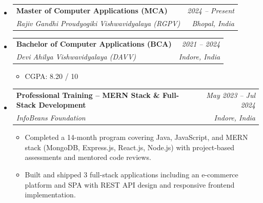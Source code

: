 \documentclass[a4paper,10pt]{article}
\makeatletter
\newcommand{\resumeSubheading}[4]{
  \vspace{2pt}\item
  \begin{tabular*}{\textwidth}{l@{\extracolsep{\fill}}r}
    \textbf{#1} & \textit{\small #2} \\
    \small\textit{#3} & \textit{\small #4} \\
  \end{tabular*}\vspace{-4pt}
}
\newcommand{\resumeItem}[1]{\item\small{#1\vspace{-1pt}}}
\makeatother
\begin{document}
\begin{itemize}[leftmargin=0.15in, label={}]

\resumeSubheading
  {Master of Computer Applications (MCA)}{2024 -- Present}
  {Rajiv Gandhi Proudyogiki Vishwavidyalaya (RGPV)}{Bhopal, India}

\vspace{4pt}

\resumeSubheading
  {Bachelor of Computer Applications (BCA)}{2021 -- 2024}
  {Devi Ahilya Vishwavidyalaya (DAVV)}{Indore, India}
\begin{itemize}[leftmargin=*]
  \resumeItem{CGPA: 8.20 / 10}
\end{itemize}

\vspace{4pt}

\resumeSubheading
  {Professional Training -- MERN Stack \& Full-Stack Development}{May 2023 -- Jul 2024}
  {InfoBeans Foundation}{Indore, India}
\begin{itemize}[leftmargin=*]
  \resumeItem{Completed a 14-month program covering Java, JavaScript, and MERN stack (MongoDB, Express.js, React.js, Node.js) with project-based assessments and mentored code reviews.}
  \resumeItem{Built and shipped 3 full-stack applications including an e-commerce platform and SPA with REST API design and responsive frontend implementation.}
\end{itemize}

\end{itemize}
\end{document}
